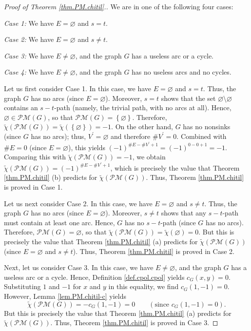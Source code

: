 \documentclass[12pt]{amsart}
\theoremstyle{definition}
\newcommand{\Pm}[1]{\mathcal{PM}\left(#1\right)}
\newcommand{\NS}{V^{\prime}}
\begin{document}
\begin{proof}[Proof of Theorem \ref{thm.PM.chitil}.]
We are in one of the following four cases:

\textit{Case 1:} We have $E=\varnothing$ and $s=t$.

\textit{Case 2:} We have $E=\varnothing$ and $s\neq t$.

\textit{Case 3:} We have $E\neq\varnothing$, and the graph $G$ has a useless
arc or a cycle.

\textit{Case 4:} We have $E\neq\varnothing$, and the graph $G$ has no useless
arcs and no cycles.

Let us first consider Case 1. In this case, we have $E=\varnothing$ and $s=t$.
Thus, the graph $G$ has no arcs (since $E=\varnothing$). Moreover, $s=t$
shows that the set $\varnothing\setminus\varnothing$ contains an $s-t$-path
(namely, the trivial path, with no arcs at all). Hence, $\varnothing
\in\Pm{G}$, so that $\Pm{G}
=\left\{  \varnothing\right\}  $. Therefore, $\widetilde{\chi}\left(
\Pm{G}\right)  =\widetilde{\chi}\left(  \left\{
\varnothing\right\}  \right)  =-1$. On the other hand, $G$ has no nonsinks
(since $G$ has no arcs); thus, $\NS=\varnothing$ and therefore
$\#\NS=0$. Combined with $\#E=0$ (since $E=\varnothing$), this yields
$\left(  -1\right)  ^{\#E-\#\NS+1}=\left(  -1\right)  ^{0-0+1}=-1$.
Comparing this with $\widetilde{\chi}\left(  \Pm{G}
\right)  =-1$, we obtain $\widetilde{\chi}\left(  \Pm{G}  \right)
=\left(  -1\right)  ^{\#E-\#\NS+1}$, which is
precisely the value that Theorem \ref{thm.PM.chitil} (b) predicts for
$\widetilde{\chi}\left(  \Pm{G} \right)  $. Thus,
Theorem \ref{thm.PM.chitil} is proved in Case 1.

Let us next consider Case 2. In this case, we have $E=\varnothing$ and $s\neq
t$. Thus, the graph $G$ has no arcs (since $E=\varnothing$). Moreover, $s\neq
t$ shows that any $s-t$-path must contain at least one arc. Hence, $G$ has no
$s-t$-path (since $G$ has no arcs). Therefore, $\Pm{G}
=\varnothing$, so that $\widetilde{\chi}\left(  \Pm{G}
\right)  =\widetilde{\chi}\left(  \varnothing\right)  =0$. But this is
precisely the value that Theorem \ref{thm.PM.chitil} (a) predicts for
$\widetilde{\chi}\left(  \Pm{G} \right)  $ (since $E=\varnothing$ and $s\neq
t$). Thus, Theorem \ref{thm.PM.chitil} is proved in Case 2.

Next, let us consider Case 3. In this case, we have $E\neq\varnothing$, and
the graph $G$ has a useless arc or a cycle. Hence, Definition
\ref{def.cpol.cpol} yields $c_{G}\left(  x,y\right)  =0$. Substituting $1$ and
$-1$ for $x$ and $y$ in this equality, we find $c_{G}\left(  1,-1\right)  =0$.
However, Lemma \ref{lem.PM.chitil-c} yields%
\[
\widetilde{\chi}\left(  \Pm{G}\right)
= - c_{G}\left(  1,-1\right)
=0
\qquad \left(\text{since }c_{G}\left(  1,-1\right) = 0\right).
\]
But this is precisely the value that Theorem \ref{thm.PM.chitil} (a)
predicts for $\widetilde{\chi}\left(  \Pm{G}\right)  $. Thus, Theorem
\ref{thm.PM.chitil} is proved in Case 3.


\end{proof}
\end{document}
